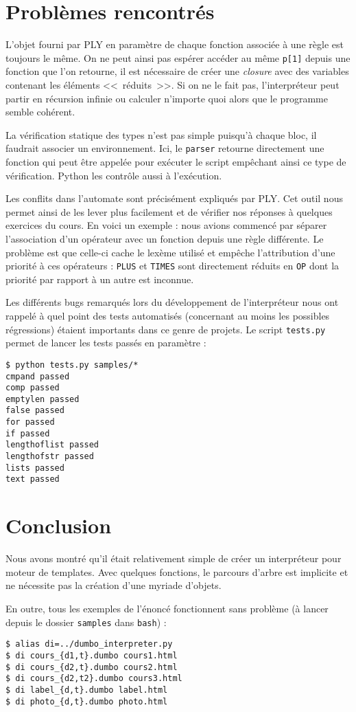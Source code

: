 \documentclass[12pt,twocolumn]{article}
\begin{document}
\section{Problèmes rencontrés}
L'objet fourni par PLY en paramètre de chaque fonction
associée à une règle est toujours le même. On ne peut ainsi
pas espérer accéder au même \texttt{p[1]} depuis une fonction
que l'on retourne, il est nécessaire de créer une \textit{closure}
avec des variables contenant les éléments <<~réduits~>>.
Si on ne le fait pas, l'interpréteur peut partir en récursion infinie
ou calculer n'importe quoi alors que le programme semble cohérent.

La vérification statique des types n'est pas simple puisqu'à chaque bloc,
il faudrait associer un environnement. Ici, le \texttt{parser} retourne
directement une fonction qui peut être appelée pour exécuter le script
empêchant ainsi ce type de vérification.
Python les contrôle aussi à l'exécution.

Les conflits dans l'automate sont précisément expliqués par PLY.
Cet outil nous permet ainsi de les lever plus facilement et de vérifier
nos réponses à quelques exercices du cours.
En voici un exemple : nous avions commencé par séparer l'association
d'un opérateur avec un fonction depuis une règle différente. Le problème
est que celle-ci cache le lexème utilisé et empêche l'attribution d'une
priorité à ces opérateurs : \texttt{PLUS} et \texttt{TIMES} sont directement
réduits en \texttt{OP} dont la priorité par rapport à un autre est inconnue.

Les différents bugs remarqués lors du développement de l'interpréteur
nous ont rappelé à quel point des tests automatisés (concernant au moins
les possibles régressions) étaient importants dans ce genre
de projets. Le script \texttt{tests.py} permet de lancer les tests
passés en paramètre :
\begin{verbatim}
$ python tests.py samples/*
cmpand passed
comp passed
emptylen passed
false passed
for passed
if passed
lengthoflist passed
lengthofstr passed
lists passed
text passed
\end{verbatim}


\section{Conclusion}
Nous avons montré qu'il était relativement simple de créer un interpréteur
pour moteur de templates. Avec quelques fonctions, le parcours d'arbre
est implicite et ne nécessite pas la création d'une myriade d'objets.

En outre, tous les exemples de l'énoncé fonctionnent sans problème
(à lancer depuis le dossier \texttt{samples} dans \texttt{bash}) :
\begin{verbatim}
$ alias di=../dumbo_interpreter.py
$ di cours_{d1,t}.dumbo cours1.html
$ di cours_{d2,t}.dumbo cours2.html
$ di cours_{d2,t2}.dumbo cours3.html
$ di label_{d,t}.dumbo label.html
$ di photo_{d,t}.dumbo photo.html
\end{verbatim}
\end{document}
